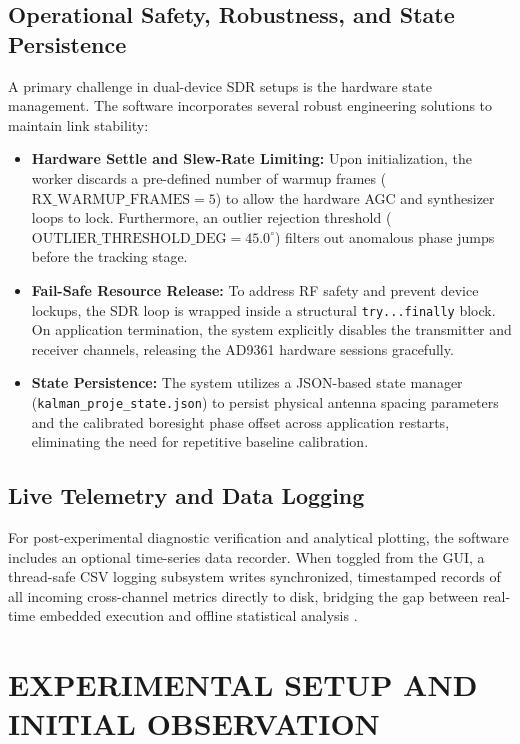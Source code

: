 \documentclass[conference]{IEEEtran}
\begin{document}
\subsection{Operational Safety, Robustness, and State Persistence}
A primary challenge in dual-device SDR setups is the hardware state management. The software incorporates several robust engineering solutions to maintain link stability:
\begin{itemize}
    \item \textbf{Hardware Settle and Slew-Rate Limiting:} Upon initialization, the worker discards a pre-defined number of warmup frames ($\text{RX\_WARMUP\_FRAMES} = 5$) to allow the hardware AGC and synthesizer loops to lock. Furthermore, an outlier rejection threshold ($\text{OUTLIER\_THRESHOLD\_DEG} = 45.0^\circ$) filters out anomalous phase jumps before the tracking stage.
    \item \textbf{Fail-Safe Resource Release:} To address RF safety and prevent device lockups, the SDR loop is wrapped inside a structural \texttt{try...finally} block. On application termination, the system explicitly disables the transmitter and receiver channels, releasing the AD9361 hardware sessions gracefully.
    \item \textbf{State Persistence:} The system utilizes a JSON-based state manager (\texttt{kalman\_proje\_state.json}) to persist physical antenna spacing parameters and the calibrated boresight phase offset across application restarts, eliminating the need for repetitive baseline calibration.
\end{itemize}

\subsection{Live Telemetry and Data Logging}
For post-experimental diagnostic verification and analytical plotting, the software includes an optional time-series data recorder. When toggled from the GUI, a thread-safe CSV logging subsystem writes synchronized, timestamped records of all incoming cross-channel metrics directly to disk, bridging the gap between real-time embedded execution and offline statistical analysis \cite{Hou2023RobustVB-EKF}.



\section{EXPERIMENTAL SETUP AND INITIAL OBSERVATION}
\label{sec:experimental_setup}
\end{document}
